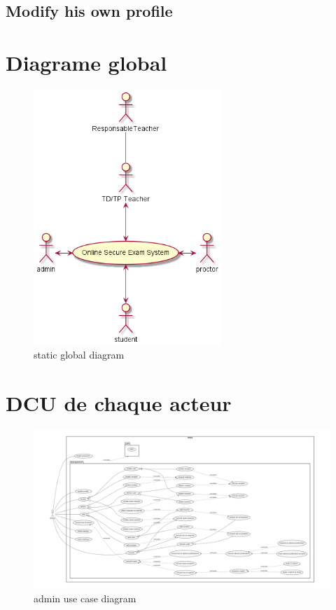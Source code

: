 \documentclass[a4paper,12p]{article}
\begin{document}
     \subsection{Modify his own profile}
     \vspace{5cm}
     \section{Diagrame global }
     \begin{figure}[h]
         \centering
         \includegraphics[width=200pt]{SCD}
         \caption{static global diagram}
     \end{figure}
     \clearpage
     \section{DCU de chaque acteur}
     \vspace{5cm} %

    \begin{figure}[h]
        \centering
        \includegraphics[width=\textwidth]{admin_UCD}
        \caption{admin use case diagram}
    \end{figure}
\end{document}
